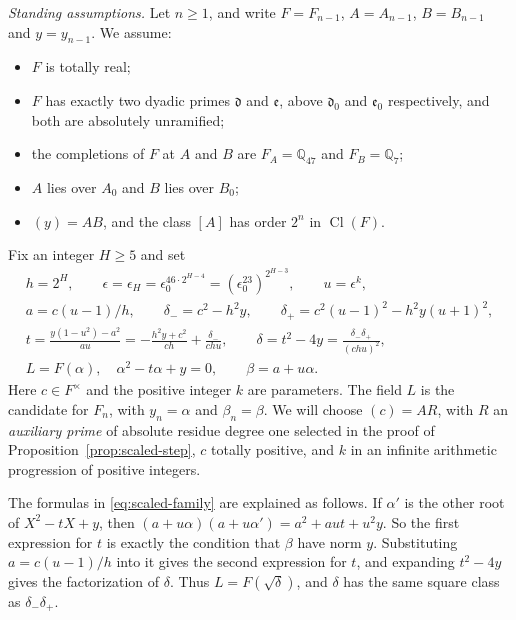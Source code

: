 \documentclass[11pt]{article}
\theoremstyle{plain}
\theoremstyle{definition}
\theoremstyle{remark}
\DeclareMathOperator{\Cl}{Cl}
\newcommand{\Q}{\mathbb Q}
\begin{document}
\emph{Standing assumptions.}  Let $n\ge1$, and write $F=F_{n-1}$,
$A=A_{n-1}$, $B=B_{n-1}$ and $y=y_{n-1}$.  We assume:
\begin{itemize}
\item $F$ is totally real;
\item $F$ has exactly two dyadic primes $\mathfrak d$ and $\mathfrak e$,
above $\mathfrak d_0$ and $\mathfrak e_0$ respectively, and both are
absolutely unramified;
\item the completions of $F$ at $A$ and $B$ are $F_A=\Q_{47}$ and
$F_B=\Q_7$;
\item $A$ lies over $A_0$ and $B$ lies over $B_0$;
\item $(y)=AB$, and the class $[A]$ has order $2^n$ in $\Cl(F)$.
\end{itemize}
Fix an integer $H\ge5$ and set
\begin{equation}\label{eq:scaled-family}
\begin{gathered}
 h=2^H,\qquad \epsilon=\epsilon_H
   =\epsilon_0^{46\cdot2^{H-4}}=(\epsilon_0^{23})^{2^{H-3}},\qquad u=\epsilon^k,\\
 a=c(u-1)/h,\qquad \delta_-=c^2-h^2y,\qquad
 \delta_+=c^2(u-1)^2-h^2y(u+1)^2,\\
 t=\frac{y(1-u^2)-a^2}{au}
   =-\frac{h^2y+c^2}{ch}+\frac{\delta_-}{chu},\qquad
 \delta=t^2-4y=\frac{\delta_-\delta_+}{(chu)^2},\\
 L=F(\alpha),\quad\alpha^2-t\alpha+y=0,\qquad
 \beta=a+u\alpha.
\end{gathered}
\end{equation}
Here $c\in F^\times$ and the positive integer $k$ are parameters.  The
field $L$ is the candidate for $F_n$, with $y_n=\alpha$ and
$\beta_n=\beta$.  We will choose $(c)=AR$, with $R$ an \emph{auxiliary
prime} of absolute residue degree one selected in the proof of
Proposition~\ref{prop:scaled-step}, $c$ totally positive, and $k$ in an
infinite arithmetic progression of positive integers.

The formulas in \eqref{eq:scaled-family} are explained as follows.  If
$\alpha'$ is the other root of $X^2-tX+y$, then
$(a+u\alpha)(a+u\alpha')=a^2+aut+u^2y$.  So the first expression for $t$
is exactly the condition that $\beta$ have norm $y$.  Substituting
$a=c(u-1)/h$ into it gives the second expression for $t$, and expanding
$t^2-4y$ gives the factorization of $\delta$.  Thus $L=F(\sqrt\delta)$,
and $\delta$ has the same square class as $\delta_-\delta_+$.
\end{document}
